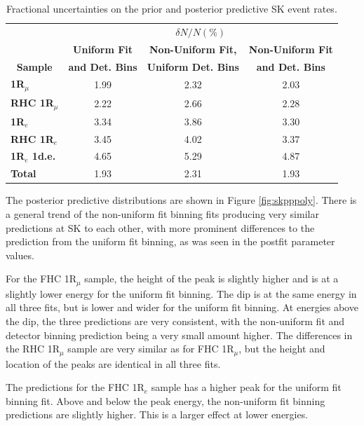 \begin{center}
\begin{table}[!htbp]
\center
\begin{tabular}{l||c c c}
\hline \hline
& \multicolumn{3}{c}{$\delta N/N (\%)$}\\
& \multicolumn{1}{c}{\textbf{Uniform Fit}} & \multicolumn{1}{c}{\textbf{Non-Uniform Fit,}} & \multicolumn{1}{c}{\textbf{Non-Uniform Fit}}\\
\multicolumn{1}{c||}{\textbf{Sample}} & \multicolumn{1}{c}{\textbf{and Det. Bins}} & \multicolumn{1}{c}{\textbf{Uniform Det. Bins}} & \multicolumn{1}{c}{\textbf{and Det. Bins}}\\
\hline\hline
\textbf{1R$_{\mu}$} & 1.99 & 2.32 & 2.03\\
\textbf{RHC 1R$_{\mu}$} & 2.22 & 2.66 & 2.28 \\ 
\textbf{1R$_{e}$} & 3.34 & 3.86 & 3.30\\
\textbf{RHC 1R$_{e}$} & 3.45 & 4.02 & 3.37\\
\textbf{1R$_{e}$ 1d.e.} & 4.65 & 5.29 & 4.87\\ \hline
\textbf{Total} & 1.93 & 2.31 & 1.93\\ \hline\hline
\end{tabular}
\caption{Fractional uncertainties on the prior and posterior predictive SK event rates.}
\label{tab:SKerrpoly}
\end{table}
\end{center}

The posterior predictive distributions are shown in Figure \ref{fig:skpppoly}. There is a general trend of the non-uniform fit binning fits producing very similar predictions at SK to each other, with more prominent differences to the prediction from the uniform fit binning, as was seen in the postfit parameter values.

For the FHC 1R$_{\mu}$ sample, the height of the peak is slightly higher and is at a slightly lower energy for the uniform fit binning. The dip is at the same energy in all three fits, but is lower and wider for the uniform fit binning. At energies above the dip, the three predictions are very consistent, with the non-uniform fit and detector binning prediction being a very small amount higher. The differences in the RHC 1R$_{\mu}$ sample are very similar as for FHC 1R$_{\mu}$, but the height and location of the peaks are identical in all three fits.

The predictions for the FHC 1R$_e$ sample has a higher peak for the uniform fit binning fit. Above and below the peak energy, the non-uniform fit binning predictions are slightly higher. This is a larger effect at lower energies.


